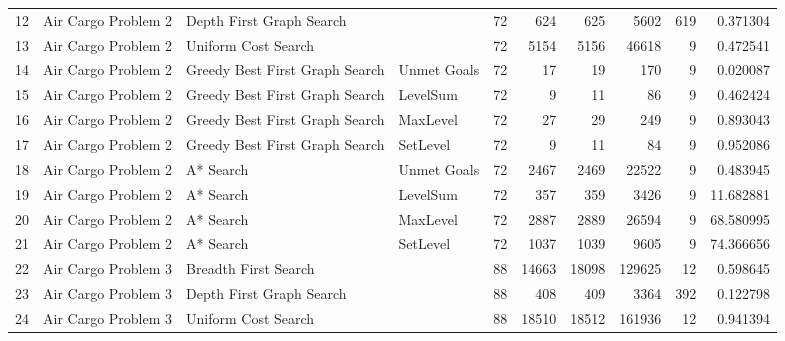 \begin{tabular}{llllrrrrrr}
12 &  Air Cargo Problem 2 &        Depth First Graph Search &              &       72 &         624 &         625 &       5602 &          619 &     0.371304 \\
13 &  Air Cargo Problem 2 &             Uniform Cost Search &              &       72 &        5154 &        5156 &      46618 &            9 &     0.472541 \\
14 &  Air Cargo Problem 2 &  Greedy Best First Graph Search &  Unmet Goals &       72 &          17 &          19 &        170 &            9 &     0.020087 \\
15 &  Air Cargo Problem 2 &  Greedy Best First Graph Search &     LevelSum &       72 &           9 &          11 &         86 &            9 &     0.462424 \\
16 &  Air Cargo Problem 2 &  Greedy Best First Graph Search &     MaxLevel &       72 &          27 &          29 &        249 &            9 &     0.893043 \\
17 &  Air Cargo Problem 2 &  Greedy Best First Graph Search &     SetLevel &       72 &           9 &          11 &         84 &            9 &     0.952086 \\
18 &  Air Cargo Problem 2 &                       A* Search &  Unmet Goals &       72 &        2467 &        2469 &      22522 &            9 &     0.483945 \\
19 &  Air Cargo Problem 2 &                       A* Search &     LevelSum &       72 &         357 &         359 &       3426 &            9 &    11.682881 \\
20 &  Air Cargo Problem 2 &                       A* Search &     MaxLevel &       72 &        2887 &        2889 &      26594 &            9 &    68.580995 \\
21 &  Air Cargo Problem 2 &                       A* Search &     SetLevel &       72 &        1037 &        1039 &       9605 &            9 &    74.366656 \\
22 &  Air Cargo Problem 3 &            Breadth First Search &              &       88 &       14663 &       18098 &     129625 &           12 &     0.598645 \\
23 &  Air Cargo Problem 3 &        Depth First Graph Search &              &       88 &         408 &         409 &       3364 &          392 &     0.122798 \\
24 &  Air Cargo Problem 3 &             Uniform Cost Search &              &       88 &       18510 &       18512 &     161936 &           12 &     0.941394 \\

\end{tabular}
